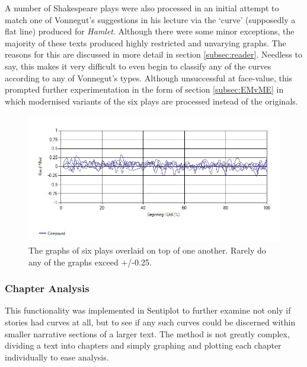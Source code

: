 \documentclass{article}
\begin{document}
            A number of Shakespeare plays were also processed in an initial attempt to match one of Vonnegut's suggestions in his lecture via the `curve' (supposedly a flat line) produced for \textit{Hamlet}. Although there were some minor exceptions, the majority of these texts produced highly restricted and unvarying graphs. The reasons for this are discussed in more detail in section \ref{subsec:reader}. Needless to say, this makes it very difficult to even begin to classify any of the curves according to any of Vonnegut’s types. Although unsuccessful at face-value, this prompted further experimentation in the form of section \ref{subsec:EMvME} in which modernised variants of the six plays are processed instead of the originals.
            \begin{figure}
                \includegraphics[width=1\textwidth]{Figures/Curve/ShakespeareOverlaid}
                \centering
                \caption{The graphs of six plays overlaid on top of one another. Rarely do any of the graphs exceed +/-0.25.} 
                \label{fig:ShakespeareOverlaid}
            \end{figure}
        \subsubsection{Chapter Analysis}
            This functionality was implemented in Sentiplot to further examine not only if stories had curves at all, but to see if any such curves could be discerned within smaller narrative sections of a larger text. The method is not greatly complex, dividing a text into chapters and simply graphing and plotting each chapter individually to ease analysis.
\end{document}
